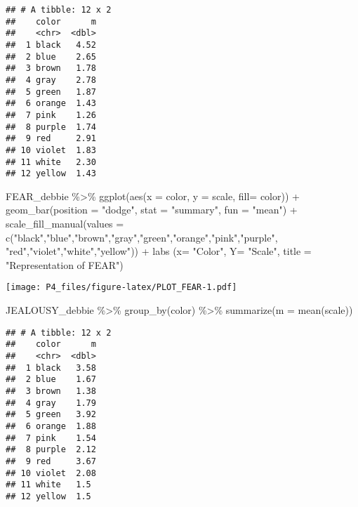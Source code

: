 \documentclass[
]{article}
\newenvironment{Shaded}{\begin{snugshade}}{\end{snugshade}}
\newcommand{\AttributeTok}[1]{\textcolor[rgb]{0.77,0.63,0.00}{#1}}
\newcommand{\FunctionTok}[1]{\textcolor[rgb]{0.00,0.00,0.00}{#1}}
\newcommand{\NormalTok}[1]{#1}
\newcommand{\SpecialCharTok}[1]{\textcolor[rgb]{0.00,0.00,0.00}{#1}}
\newcommand{\StringTok}[1]{\textcolor[rgb]{0.31,0.60,0.02}{#1}}
\begin{document}
\begin{verbatim}
## # A tibble: 12 x 2
##    color      m
##    <chr>  <dbl>
##  1 black   4.52
##  2 blue    2.65
##  3 brown   1.78
##  4 gray    2.78
##  5 green   1.87
##  6 orange  1.43
##  7 pink    1.26
##  8 purple  1.74
##  9 red     2.91
## 10 violet  1.83
## 11 white   2.30
## 12 yellow  1.43
\end{verbatim}

\begin{Shaded}
\begin{Highlighting}[]
\NormalTok{FEAR\_debbie }\SpecialCharTok{\%\textgreater{}\%}
  \FunctionTok{ggplot}\NormalTok{(}\FunctionTok{aes}\NormalTok{(}\AttributeTok{x =}\NormalTok{ color, }\AttributeTok{y =}\NormalTok{ scale, }\AttributeTok{fill=}\NormalTok{ color)) }\SpecialCharTok{+}
  \FunctionTok{geom\_bar}\NormalTok{(}\AttributeTok{position =} \StringTok{"dodge"}\NormalTok{, }\AttributeTok{stat =} \StringTok{"summary"}\NormalTok{, }\AttributeTok{fun =} \StringTok{"mean"}\NormalTok{) }\SpecialCharTok{+} \FunctionTok{scale\_fill\_manual}\NormalTok{(}\AttributeTok{values =} \FunctionTok{c}\NormalTok{(}\StringTok{"black"}\NormalTok{,}\StringTok{"blue"}\NormalTok{,}\StringTok{"brown"}\NormalTok{,}\StringTok{"gray"}\NormalTok{,}\StringTok{"green"}\NormalTok{,}\StringTok{"orange"}\NormalTok{,}\StringTok{"pink"}\NormalTok{,}\StringTok{"purple"}\NormalTok{, }\StringTok{"red"}\NormalTok{,}\StringTok{"violet"}\NormalTok{,}\StringTok{"white"}\NormalTok{,}\StringTok{"yellow"}\NormalTok{)) }\SpecialCharTok{+} \FunctionTok{labs}\NormalTok{ (}\AttributeTok{x=} \StringTok{"Color"}\NormalTok{, }\AttributeTok{Y=} \StringTok{"Scale"}\NormalTok{, }\AttributeTok{title =} \StringTok{"Representation of FEAR"}\NormalTok{)}
\end{Highlighting}
\end{Shaded}

\texttt{[image: P4\_files/figure-latex/PLOT\_FEAR-1.pdf]}

\begin{Shaded}
\begin{Highlighting}[]
\NormalTok{JEALOUSY\_debbie }\SpecialCharTok{\%\textgreater{}\%}
  \FunctionTok{group\_by}\NormalTok{(color) }\SpecialCharTok{\%\textgreater{}\%} 
  \FunctionTok{summarize}\NormalTok{(}\AttributeTok{m =} \FunctionTok{mean}\NormalTok{(scale))}
\end{Highlighting}
\end{Shaded}

\begin{verbatim}
## # A tibble: 12 x 2
##    color      m
##    <chr>  <dbl>
##  1 black   3.58
##  2 blue    1.67
##  3 brown   1.38
##  4 gray    1.79
##  5 green   3.92
##  6 orange  1.88
##  7 pink    1.54
##  8 purple  2.12
##  9 red     3.67
## 10 violet  2.08
## 11 white   1.5 
## 12 yellow  1.5
\end{verbatim}
\end{document}
